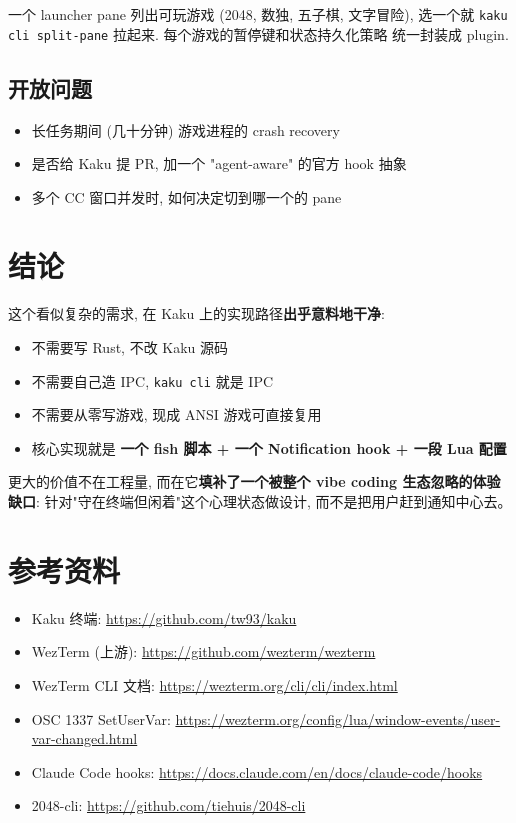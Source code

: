 \documentclass[11pt]{article}
\begin{document}
一个 launcher pane 列出可玩游戏 (2048, 数独, 五子棋, 文字冒险),
选一个就 \texttt{kaku cli split-pane} 拉起来. 每个游戏的暂停键和状态持久化策略
统一封装成 plugin.

\subsection{开放问题}

\begin{itemize}[leftmargin=*]
  \item 长任务期间 (几十分钟) 游戏进程的 crash recovery
  \item 是否给 Kaku 提 PR, 加一个 "agent-aware" 的官方 hook 抽象
  \item 多个 CC 窗口并发时, 如何决定切到哪一个的 pane
\end{itemize}

\section{结论}

这个看似复杂的需求, 在 Kaku 上的实现路径\textbf{出乎意料地干净}:

\begin{itemize}[leftmargin=*]
  \item 不需要写 Rust, 不改 Kaku 源码
  \item 不需要自己造 IPC, \texttt{kaku cli} 就是 IPC
  \item 不需要从零写游戏, 现成 ANSI 游戏可直接复用
  \item 核心实现就是 \textbf{一个 fish 脚本 + 一个 Notification hook + 一段 Lua 配置}
\end{itemize}

更大的价值不在工程量, 而在它\textbf{填补了一个被整个 vibe coding 生态忽略的体验缺口}:
针对"守在终端但闲着"这个心理状态做设计, 而不是把用户赶到通知中心去。

\appendix
\section{参考资料}

\begin{itemize}[leftmargin=*]
  \item Kaku 终端: \url{https://github.com/tw93/kaku}
  \item WezTerm (上游): \url{https://github.com/wezterm/wezterm}
  \item WezTerm CLI 文档: \url{https://wezterm.org/cli/cli/index.html}
  \item OSC 1337 SetUserVar: \url{https://wezterm.org/config/lua/window-events/user-var-changed.html}
  \item Claude Code hooks: \url{https://docs.claude.com/en/docs/claude-code/hooks}
  \item 2048-cli: \url{https://github.com/tiehuis/2048-cli}
\end{itemize}
\end{document}
